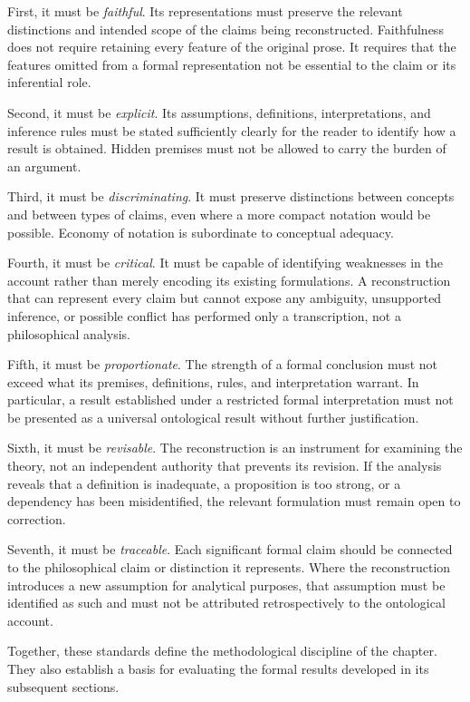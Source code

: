 First, it must be \emph{faithful}. Its representations must preserve the
relevant distinctions and intended scope of the claims being reconstructed.
Faithfulness does not require retaining every feature of the original
prose. It requires that the features omitted from a formal representation
not be essential to the claim or its inferential role.

Second, it must be \emph{explicit}. Its assumptions, definitions,
interpretations, and inference rules must be stated sufficiently clearly
for the reader to identify how a result is obtained. Hidden premises must
not be allowed to carry the burden of an argument.

Third, it must be \emph{discriminating}. It must preserve distinctions
between concepts and between types of claims, even where a more compact
notation would be possible. Economy of notation is subordinate to
conceptual adequacy.

Fourth, it must be \emph{critical}. It must be capable of identifying
weaknesses in the account rather than merely encoding its existing
formulations. A reconstruction that can represent every claim but cannot
expose any ambiguity, unsupported inference, or possible conflict has
performed only a transcription, not a philosophical analysis.

Fifth, it must be \emph{proportionate}. The strength of a formal conclusion
must not exceed what its premises, definitions, rules, and interpretation
warrant. In particular, a result established under a restricted formal
interpretation must not be presented as a universal ontological result
without further justification.

Sixth, it must be \emph{revisable}. The reconstruction is an instrument
for examining the theory, not an independent authority that prevents its
revision. If the analysis reveals that a definition is inadequate, a
proposition is too strong, or a dependency has been misidentified, the
relevant formulation must remain open to correction.

Seventh, it must be \emph{traceable}. Each significant formal claim should
be connected to the philosophical claim or distinction it represents.
Where the reconstruction introduces a new assumption for analytical
purposes, that assumption must be identified as such and must not be
attributed retrospectively to the ontological account.

Together, these standards define the methodological discipline of the
chapter. They also establish a basis for evaluating the formal results
developed in its subsequent sections.

